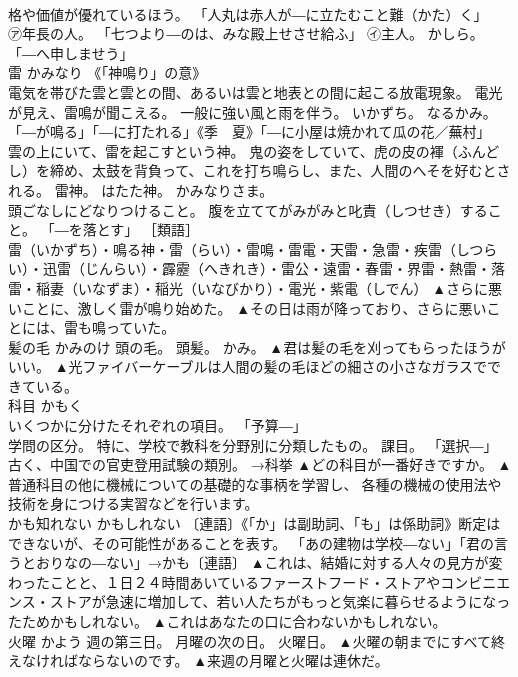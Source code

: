 \documentclass[8pt]{extreport}
\begin{document}
\begin{CJK}{UTF8}{min}
\\	格や価値が優れているほう。 「人丸は赤人が―に立たむこと難（かた）く」 
\\	㋐年長の人。 「七つより―のは、みな殿上せさせ給ふ」 ㋑主人。 かしら。 「―へ申しませう」	
\\	雷	かみなり	《「神鳴り」の意》 
\\	電気を帯びた雲と雲との間、あるいは雲と地表との間に起こる放電現象。 電光が見え、雷鳴が聞こえる。 一般に強い風と雨を伴う。 いかずち。 なるかみ。 「―が鳴る」「―に打たれる」《季　夏》「―に小屋は焼かれて瓜の花／蕪村」 
\\	雲の上にいて、雷を起こすという神。 鬼の姿をしていて、虎の皮の褌（ふんどし）を締め、太鼓を背負って、これを打ち鳴らし、また、人間のへそを好むとされる。 雷神。 はたた神。 かみなりさま。 
\\	頭ごなしにどなりつけること。 腹を立ててがみがみと叱責（しつせき）すること。 「―を落とす」 ［類語］
\\	雷（いかずち）・鳴る神・雷（らい）・雷鳴・雷電・天雷・急雷・疾雷（しつらい）・迅雷（じんらい）・霹靂（へきれき）・雷公・遠雷・春雷・界雷・熱雷・落雷・稲妻（いなずま）・稲光（いなびかり）・電光・紫電（しでん）	▲さらに悪いことに、激しく雷が鳴り始めた。 ▲その日は雨が降っており、さらに悪いことには、雷も鳴っていた。
\\	髪の毛	かみのけ	頭の毛。 頭髪。 かみ。	▲君は髪の毛を刈ってもらったほうがいい。 ▲光ファイバーケーブルは人間の髪の毛ほどの細さの小さなガラスでできている。
\\	科目	かもく	
\\	いくつかに分けたそれぞれの項目。 「予算―」 
\\	学問の区分。 特に、学校で教科を分野別に分類したもの。 課目。 「選択―」 
\\	古く、中国での官吏登用試験の類別。 →科挙	▲どの科目が一番好きですか。 ▲普通科目の他に機械についての基礎的な事柄を学習し、 各種の機械の使用法や技術を身につける実習などを行います。
\\	かも知れない	かもしれない	〔連語〕《「か」は副助詞、「も」は係助詞》断定はできないが、その可能性があることを表す。 「あの建物は学校―ない」「君の言うとおりなの―ない」→かも〔連語〕	▲これは、結婚に対する人々の見方が変わったことと、１日２４時間あいているファーストフード・ストアやコンビニエンス・ストアが急速に増加して、若い人たちがもっと気楽に暮らせるようになったためかもしれない。 ▲これはあなたの口に合わないかもしれない。
\\	火曜	かよう	週の第三日。 月曜の次の日。 火曜日。	▲火曜の朝までにすべて終えなければならないのです。 ▲来週の月曜と火曜は連休だ。

\end{CJK}
\end{document}
